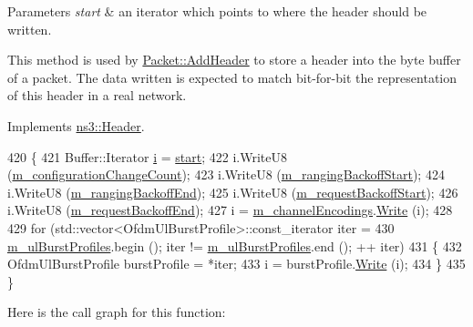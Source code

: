 \begin{DoxyParams}{Parameters}
{\em start} & an iterator which points to where the header should be written.\\
\hline
\end{DoxyParams}
This method is used by \hyperlink{classns3_1_1Packet_a465108c595a0bc592095cbcab1832ed8}{Packet\+::\+Add\+Header} to store a header into the byte buffer of a packet. The data written is expected to match bit-\/for-\/bit the representation of this header in a real network. 

Implements \hyperlink{classns3_1_1Header_afb61f1aac69ff8349a6bfe521fab5404}{ns3\+::\+Header}.


\begin{DoxyCode}
420 \{
421   Buffer::Iterator \hyperlink{bernuolliDistribution_8m_a6f6ccfcf58b31cb6412107d9d5281426}{i} = \hyperlink{namespacevisualizer_1_1core_a2a35e5d8a34af358b508dac8635754e0}{start};
422   i.WriteU8 (\hyperlink{classns3_1_1Ucd_ad8588333860e7ee98bf544151dde0547}{m\_configurationChangeCount});
423   i.WriteU8 (\hyperlink{classns3_1_1Ucd_a2bb56a9a68e0d2db278e6ad4ec9c79d2}{m\_rangingBackoffStart});
424   i.WriteU8 (\hyperlink{classns3_1_1Ucd_a3d2a0adbdf513ce664f981286c38fdc5}{m\_rangingBackoffEnd});
425   i.WriteU8 (\hyperlink{classns3_1_1Ucd_a349ad1738aaa8cb6f50dbba40be0a452}{m\_requestBackoffStart});
426   i.WriteU8 (\hyperlink{classns3_1_1Ucd_a347ffdff28ebe47d4db585c35780e54d}{m\_requestBackoffEnd});
427   i = \hyperlink{classns3_1_1Ucd_afe2c90d9bf2fd6c010743784cdb55dd8}{m\_channelEncodings}.\hyperlink{classns3_1_1UcdChannelEncodings_a305d7063870904303611ac17cca5de9d}{Write} (i);
428 
429   \textcolor{keywordflow}{for} (std::vector<OfdmUlBurstProfile>::const\_iterator iter =
430          \hyperlink{classns3_1_1Ucd_ace3bf982ecc970c46f96b8c561df29b7}{m\_ulBurstProfiles}.begin (); iter != \hyperlink{classns3_1_1Ucd_ace3bf982ecc970c46f96b8c561df29b7}{m\_ulBurstProfiles}.end (); ++
      iter)
431     \{
432       OfdmUlBurstProfile burstProfile = *iter;
433       i = burstProfile.\hyperlink{classns3_1_1Buffer_1_1Iterator_a087b4e6b5d038544c750c741e8932d69}{Write} (i);
434     \}
435 \}
\end{DoxyCode}


Here is the call graph for this function\+:


